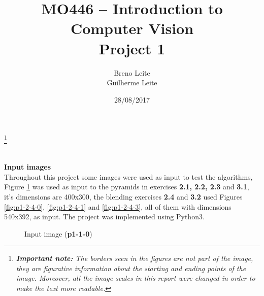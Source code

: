 \documentclass[12pt,a4paper]{article}
\title{MO446 -- Introduction to Computer Vision  \\ Project 1}
\author{Breno Leite  \\ Guilherme Leite}
\date{28/08/2017}
\newcommand\blfootnote[1]{%
	\begingroup
	\renewcommand\thefootnote{}\footnote{#1}%
	\addtocounter{footnote}{-1}%
	\endgroup
}
\begin{document}
\maketitle
\blfootnote{\textit{\textbf{Important note:} The borders seen in the figures are not part of the image, they are figurative information about the starting and ending points of the image. Moreover, all the image scales in this report were changed in order to make the text more readable.}} \\


\textbf{Input images}\\

Throughout this project some images were used as input to test the algorithms, Figure \ref{fig:p1-1-0} was used as input to the pyramids in exercises \textbf{2.1, 2.2, 2.3} and \textbf{3.1}, it's dimensions are 400x300, the blending exercises \textbf{2.4} and \textbf{3.2} used Figures \ref{fig:p1-2-4-0}, \ref{fig:p1-2-4-1} and \ref{fig:p1-2-4-3}, all of them with dimensions 540x392, as input. The project was implemented using Python3.\\

\begin{figure}[!h]
	\centering
	{%
		\setlength{\fboxsep}{1pt}%
		\setlength{\fboxrule}{1pt}%
	}%
	\caption{Input image (\textbf{p1-1-0})}
	\label{fig:p1-1-0}
\end{figure}
\end{document}
